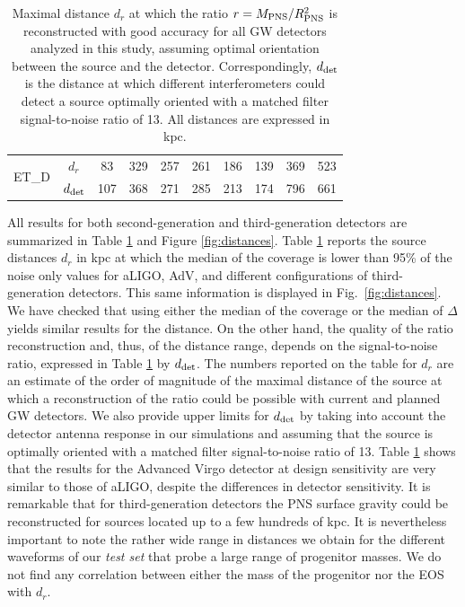 \begin{table}
\begin{tabular}{c|c|cccccccc}
\hline
\multirow{2}{*}{ET\_D} & $d_{r}$ & 83  & 329 & 257 & 261 & 186 & 139 & 369 & 523 \\
\cline{2-10}
                       & $d_{\rm det}$ & 107 & 368 & 271 & 285 & 213 & 174 & 796  & 661\\

  \end{tabular}
  \caption{%
  Maximal distance $d_{r}$ at which the ratio $r=M_{\rm PNS}/R_{\rm PNS}^2$ is reconstructed
    with good accuracy for all GW detectors analyzed in this study, assuming optimal orientation between the source and the detector. Correspondingly, $d_{\rm det}$ is the distance at which different interferometers could detect a source
    optimally oriented with a matched filter signal-to-noise ratio of 13. All distances are expressed in kpc.
  }
  \label{tab:results}
\end{table}

All results for both second-generation and third-generation detectors are summarized in Table \ref{tab:results} and Figure
\ref{fig:distances}. Table \ref{tab:results} reports the source distances $d_r$ in kpc at which the median of the coverage is lower than 95\% of the noise only values for aLIGO, AdV, and different configurations of third-generation detectors. This same information is displayed in Fig.~\ref{fig:distances}. We have checked that using either the median of the coverage or the median of $\Delta$ yields similar results for the distance. On the other hand, the quality of the ratio reconstruction and, thus, of the distance range, depends on the signal-to-noise ratio, expressed in Table \ref{tab:results} by $d_{\rm det}$. The numbers reported on the table for $d_r$ are an estimate of the order of magnitude of the maximal distance of the source  at which a
reconstruction of the ratio could be possible with current and planned GW detectors. We also provide upper limits for $d_{\rm det}$ by taking into account the detector antenna response in our simulations and assuming that the source is optimally oriented with a matched filter signal-to-noise ratio of 13. Table \ref{tab:results} shows that the results for the Advanced Virgo detector at design sensitivity are very similar to those of aLIGO, despite the differences in detector sensitivity. It is remarkable that for third-generation detectors the PNS surface gravity  could be reconstructed for sources located up to a few hundreds of kpc. It is nevertheless important to note the rather wide range in distances we obtain for the different waveforms of our {\it test set} that probe a large range of progenitor masses. We do not find any correlation between either the mass of the progenitor nor the EOS with $d_r$.

